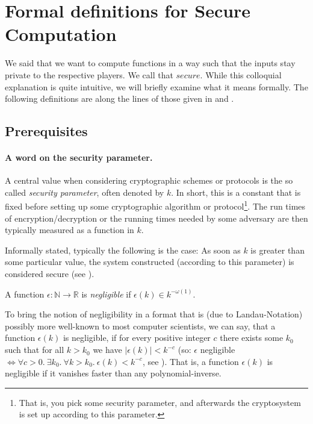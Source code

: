 \section{Formal definitions for Secure Computation}
\label{sec:formal-definition}

We said that we want to compute functions in a way such that the inputs stay private to the respective players. We call that $secure$. While this colloquial explanation is quite intuitive, we will briefly examine what it means formally. The following definitions are along the lines of those given in \cite{Rogaway:1991:RCS:888502} and \cite{Beaver1990}.

\subsection{Prerequisites}
\label{sec:prerequisites}

\paragraph{A word on the security parameter.}

A central value when considering cryptographic schemes or protocols is the so called \emph{security parameter}, often denoted by $k$. In short, this is a constant that is fixed before setting up some cryptographic algorithm or protocol\footnote{That is, you pick some security parameter, and afterwards the cryptosystem is set up according to this parameter.}. The run times of encryption/decryption or the running times needed by some adversary are then typically measured as a function in $k$.

Informally stated, typically the following is the case: As soon as $k$ is greater than some particular value, the system constructed (according to this parameter) is considered secure (see \cite{lecture-notes-goldwasser-bellare}).

\begin{definition}[Negligibility]
  A function $\epsilon:\mathbb{N}\rightarrow\mathbb{R}$ is \emph{negligible} if $\epsilon(k)\in k^{-\omega(1)}$.
\end{definition}

To bring the notion of negligibility in a format that is (due to Landau-Notation) possibly more well-known to most computer scientists, we can say, that a function $\epsilon(k)$ is negligible, if for every positive integer $c$ there exists some $k_0$ such that for all $k>k_0$ we have $|\epsilon(k)|<k^{-c}$ (so: $\epsilon$ negligible $\Leftrightarrow \forall c>0.\ \exists k_0.\ \forall k>k_0.\ \epsilon(k)<k^{-c}$, see \cite{bellare-hoang-rogaway-garbling-schemes}). That is, a function $\epsilon(k)$ is negligible if it vanishes faster than any polynomial-inverse.

